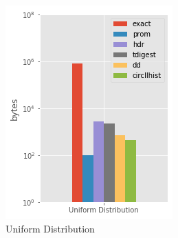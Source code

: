 \documentclass{article}
\theoremstyle{plain}
\theoremstyle{remark}
\begin{document}
\begin{figure}[t!]
    \centering
    \begin{subfigure}[t]{0.3\textwidth}
      \includegraphics[width=\textwidth]{evaluation/images/Uniform_Distribution_size.png}
      \caption{Uniform Distribution}
    \end{subfigure}
    ~
    \begin{subfigure}[t]{0.3\textwidth}

\end{subfigure}
\end{figure}
\end{document}
